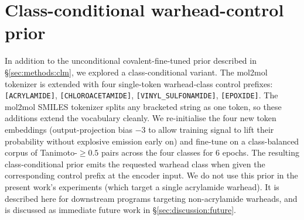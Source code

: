 \section{Class-conditional warhead-control prior}\label{sec:appendix:warhead_tokens}

In addition to the unconditional covalent-fine-tuned prior described in \S\ref{sec:methods:clm}, we explored a class-conditional variant. The mol2mol tokenizer is extended with four single-token warhead-class control prefixes: \texttt{[ACRYLAMIDE]}, \texttt{[CHLOROACETAMIDE]}, \texttt{[VINYL\_SULFONAMIDE]}, \texttt{[EPOXIDE]}. The mol2mol SMILES tokenizer splits any bracketed string as one token, so these additions extend the vocabulary cleanly. We re-initialise the four new token embeddings (output-projection bias $-3$ to allow training signal to lift their probability without explosive emission early on) and fine-tune on a class-balanced corpus of Tanimoto-$\ge 0.5$ pairs across the four classes for $6$ epochs. The resulting class-conditional prior emits the requested warhead class when given the corresponding control prefix at the encoder input. We do not use this prior in the present work's experiments (which target a single acrylamide warhead). It is described here for downstream programs targeting non-acrylamide warheads, and is discussed as immediate future work in \S\ref{sec:discussion:future}.
